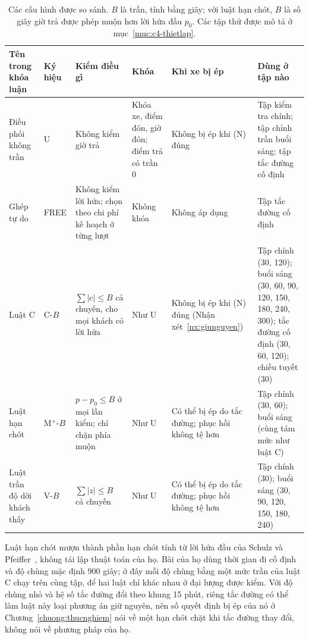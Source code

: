 \begin{table}[htbp]
\centering
\caption{Các cấu hình được so sánh. $B$ là trần, tính bằng giây; với luật hạn chót, $B$ là số giây giờ trả được
phép muộn hơn lời hứa đầu $p_0$. Các tập thử được mô tả ở mục~\ref{muc:c4-thietlap}.}
\label{bang:luat}
\footnotesize
\setlength{\tabcolsep}{3pt}
\begin{tabular}{@{}p{2.2cm}p{1.0cm}p{3.2cm}p{2.3cm}p{2.6cm}p{3.5cm}@{}}
\toprule
\textbf{Tên trong khóa luận} & \textbf{Ký hiệu} & \textbf{Kiểm điều gì} & \textbf{Khóa} & \textbf{Khi xe bị
ép} & \textbf{Dùng ở tập nào}\\
\midrule
Điều phối không trần & U & Không kiểm giờ trả & Khóa xe, điểm đón, giờ đón; điểm trả có trần 0 & Không bị ép
khi (N) đúng & Tập kiểm tra chính; tập chỉnh trần buổi sáng; tập tắc đường cố định\\
Ghép tự do & FREE & Không kiểm lời hứa; chọn theo chi phí kế hoạch ở từng lượt & Không khóa & Không áp dụng &
Tập tắc đường cố định\\
Luật C & C-$B$ & $\sum |c| \le B$ cả chuyến, cho mọi khách có lời hứa & Như U & Không bị ép khi (N) đúng
(Nhận xét~\ref{nx:giunguyen}) & Tập chính (30, 120); buổi sáng (30, 60, 90, 120, 150, 180, 240, 300); tắc
đường cố định (30, 60, 120); chiều tuyết (30)\\
Luật hạn chót & M$^{+}$-$B$ & $p - p_0 \le B$ ở mọi lần kiểm; chỉ chặn phía muộn & Như U & Có thể bị ép do tắc
đường; phục hồi không tệ hơn & Tập chính (30, 60); buổi sáng (cùng tám mức như luật C)\\
Luật trần độ dời khách thấy & V-$B$ & $\sum |z| \le B$ cả chuyến & Như U & Có thể bị ép do tắc đường; phục hồi
không tệ hơn & Tập chính (30); buổi sáng (30, 90, 120, 150, 180, 240)\\
\bottomrule
\end{tabular}
\end{table}

Luật hạn chót mượn thành phần hạn chót tính từ lời hứa đầu của Schulz và Pfeiffer~\cite{schulz2026}, không tái
lập thuật toán của họ. Bài của họ dùng thời gian đi cố định và độ chùng mặc định 900 giây; ở đây mỗi độ chùng
bằng một mức trần của luật C chạy trên cùng tập, để hai luật chỉ khác nhau ở đại lượng được kiểm. Với độ chùng
nhỏ và hệ số tắc đường đổi theo khung 15 phút, riêng tắc đường có thể làm luật này loại phương án giữ nguyên, nên
số quyết định bị ép của nó ở Chương~\ref{chuong:thucnghiem} nói về một hạn chót chặt khi tắc đường thay đổi,
không nói về phương pháp của họ.

